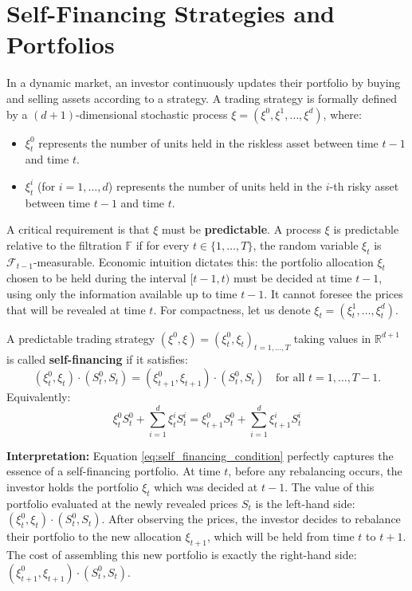 \section{Self-Financing Strategies and Portfolios}

In a dynamic market, an investor continuously updates their portfolio by buying and selling assets according to a strategy. A trading strategy is formally defined by a $(d+1)$-dimensional stochastic process $\xi = (\xi^0, \xi^1, \dots, \xi^d)$, where:
\begin{itemize}
    \item $\xi_t^0$ represents the number of units held in the riskless asset between time $t-1$ and time $t$.
    \item $\xi_t^i$ (for $i=1, \dots, d$) represents the number of units held in the $i$-th risky asset between time $t-1$ and time $t$.
\end{itemize}

A critical requirement is that $\xi$ must be \textbf{predictable}. A process $\xi$ is predictable relative to the filtration $\mathbb{F}$ if for every $t \in \{1, \dots, T\}$, the random variable $\xi_t$ is $\mathcal{F}_{t-1}$-measurable. Economic intuition dictates this: the portfolio allocation $\xi_t$ chosen to be held during the interval $[t-1, t)$ must be decided at time $t-1$, using only the information available up to time $t-1$. It cannot foresee the prices that will be revealed at time $t$. For compactness, let us denote $\xi_t = (\xi_t^1, \dots, \xi_t^d)$. 

\begin{definition}
A predictable trading strategy $(\xi^0, \xi) = (\xi_t^0, \xi_t)_{t=1, \dots, T}$ taking values in $\mathbb{R}^{d+1}$ is called \textbf{self-financing} if it satisfies:
\begin{equation}
\label{eq:self_financing_condition}
\left(\xi_t^0, \xi_t\right) \cdot \left(S_t^0, S_t\right) = \left(\xi_{t+1}^0, \xi_{t+1}\right) \cdot \left(S_t^0, S_t\right) \quad \text{for all } t = 1, \dots, T-1.
\end{equation}
Equivalently:
$$
\xi_t^0 S_t^0 + \sum_{i=1}^d \xi_t^i S_t^i = \xi_{t+1}^0 S_t^0 + \sum_{i=1}^d \xi_{t+1}^i S_t^i
$$
\end{definition}

\textbf{Interpretation:} Equation \eqref{eq:self_financing_condition} perfectly captures the essence of a self-financing portfolio. 
At time $t$, before any rebalancing occurs, the investor holds the portfolio $\xi_t$ which was decided at $t-1$. The value of this portfolio evaluated at the newly revealed prices $S_t$ is the left-hand side: $(\xi_t^0, \xi_t) \cdot (S_t^0, S_t)$.
After observing the prices, the investor decides to rebalance their portfolio to the new allocation $\xi_{t+1}$, which will be held from time $t$ to $t+1$. The cost of assembling this new portfolio is exactly the right-hand side: $(\xi_{t+1}^0, \xi_{t+1}) \cdot (S_t^0, S_t)$.

